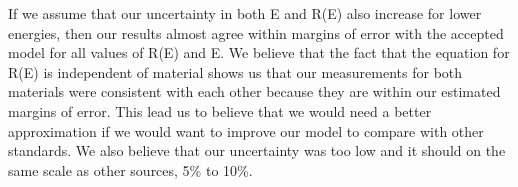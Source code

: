   
If we assume that our uncertainty in both E and R(E) also increase for lower energies, then our results almost agree within margins of error with the accepted model for all values of R(E) and E.  We believe that the fact that the equation for R(E) is independent of material shows us that our measurements for both materials were consistent with each other because they are within our estimated margins of error.  This lead us to believe that we would need a better approximation if we would want to improve our model to compare with other standards.  We also believe that our uncertainty was too low and it should on the same scale as other sources, 5\% to 10\%.

